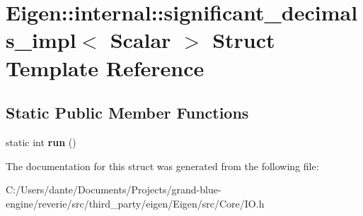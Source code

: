\hypertarget{struct_eigen_1_1internal_1_1significant__decimals__impl}{}\section{Eigen\+::internal\+::significant\+\_\+decimals\+\_\+impl$<$ Scalar $>$ Struct Template Reference}
\label{struct_eigen_1_1internal_1_1significant__decimals__impl}
\subsection*{Static Public Member Functions}
\begin{DoxyCompactItemize}
\item 
\mbox{\label{struct_eigen_1_1internal_1_1significant__decimals__impl_a5067c92af24f8102e8b41e3716db4894}} 
static int {\bfseries run} ()
\end{DoxyCompactItemize}


The documentation for this struct was generated from the following file\+:\begin{DoxyCompactItemize}
\item 
C\+:/\+Users/dante/\+Documents/\+Projects/grand-\/blue-\/engine/reverie/src/third\+\_\+party/eigen/\+Eigen/src/\+Core/I\+O.\+h\end{DoxyCompactItemize}
